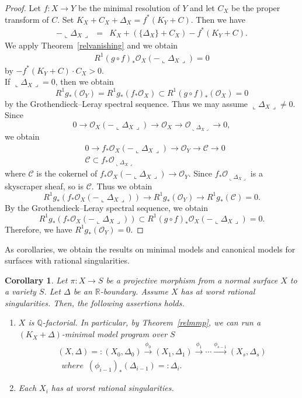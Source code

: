 \documentclass[12pt,twoside]{amsart}
\newtheorem{cor}[thm]{Corollary}
\theoremstyle{definition}
\newcommand{\Q}{$\mathbb{Q}$}
\begin{document}
\begin{proof}
Let $f:X \to Y$ be the minimal resolution of $Y$ and 
let $C_X$ be the proper transform of $C$. 
Set $K_X+C_X+\Delta_X=f^*(K_Y+C)$. 
Then we have 
\begin{eqnarray*}
-\llcorner \Delta_X\lrcorner&=&K_X+(\{\Delta_X\}+C_X)-f^*(K_Y+C).
\end{eqnarray*}
We apply Theorem~\ref{relvanishing} and we obtain 
\begin{eqnarray*}
R^1(g\circ f)_*\mathcal O_X(-\llcorner \Delta_X\lrcorner) = 0
\end{eqnarray*}
by $-f^*(K_Y+C)\cdot C_X>0.$ \\
If $\llcorner \Delta_X\lrcorner=0$, then we obtain 
$$R^1g_*(\mathcal{O}_Y)=R^1g_*(f_*\mathcal{O}_X) \subset
R^1(g\circ f)_*(\mathcal{O}_X)=0 $$
by the Grothendieck--Leray spectral sequence. 
Thus we may assume $\llcorner \Delta_X\lrcorner\neq 0$. 
Since 
$$0 \to 
\mathcal{O}_X(-\llcorner \Delta_X\lrcorner) \to 
\mathcal{O}_X \to 
\mathcal{O}_{\llcorner \Delta_X\lrcorner} \to 0, $$
we obtain 
\begin{eqnarray*}
&0 \to 
f_*\mathcal{O}_X(-\llcorner \Delta_X\lrcorner) \to 
\mathcal{O}_Y \to 
\mathcal{C} \to 0\\
&\mathcal{C} \subset f_*\mathcal{O}_{\llcorner \Delta_X\lrcorner}
\end{eqnarray*}
where $\mathcal{C}$ is the cokernel of 
$f_*\mathcal{O}_X(-\llcorner \Delta_X\lrcorner) \to 
\mathcal{O}_Y$. 
Since $f_*\mathcal{O}_{\llcorner \Delta_X\lrcorner}$ is a skyscraper sheaf, 
so is $\mathcal{C}$. 
Thus we obtain 
$$
R^1g_*(f_*\mathcal{O}_X(-\llcorner \Delta_X\lrcorner)) \to 
R^1g_*(\mathcal{O}_Y) \to R^1g_*(\mathcal{C})=0.
$$
By the Grothendieck--Leray spectral sequence, 
we obtain 
$$R^1g_*(f_*\mathcal{O}_X(-\llcorner \Delta_X\lrcorner))
\subset R^1(g\circ f)_*\mathcal{O}_X(-\llcorner \Delta_X\lrcorner)=0.$$ 
Therefore, we have $R^1g_*(\mathcal{O}_Y)=0.$ 
\end{proof}

As corollaries, 
we obtain the results on minimal models and canonical models 
for surfaces with rational singularities. 


\begin{cor}\label{mmratsing}
Let $\pi:X \to S$ be a projective morphism from 
a normal surface $X$ to a variety $S$. 
Let $\Delta$ be an $\mathbb{R}$-boundary. 
Assume $X$ has at worst rational singularities. 
Then, the following assertions holds. 
\begin{enumerate}
\item{$X$ is \Q-factorial. In particular, by Theorem~\ref{relmmp}, 
we can run a $(K_X+\Delta)$-minimal model program over $S$ 
\begin{eqnarray*}
&(X, \Delta)=:(X_0, \Delta_0) \overset{\phi_0}\to 
(X_1, \Delta_1) \overset{\phi_1}\to \cdots 
\overset{\phi_{s-1}}\to (X_s, \Delta_s)\\
&\,\,\,where\,\,\,(\phi_{i-1})_*(\Delta_{i-1})=:\Delta_i.
\end{eqnarray*}}
\item{Each $X_i$ has at worst rational singularities. }
\end{enumerate}
\end{cor}
\end{document}
